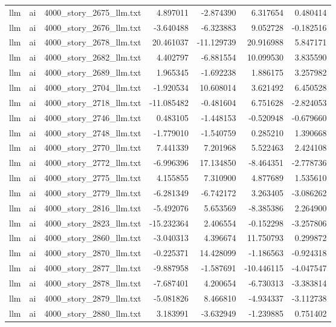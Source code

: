 \begin{longtable}{lllrrrr}
llm & ai & 4000\_story\_2675\_llm.txt & 4.897011 & -2.874390 & 6.317654 & 0.480414 \\
llm & ai & 4000\_story\_2676\_llm.txt & -3.640488 & -6.323883 & 9.052728 & -0.182516 \\
llm & ai & 4000\_story\_2678\_llm.txt & 20.461037 & -11.129739 & 20.916988 & 5.847171 \\
llm & ai & 4000\_story\_2682\_llm.txt & 4.402797 & -6.881554 & 10.099530 & 3.835590 \\
llm & ai & 4000\_story\_2689\_llm.txt & 1.965345 & -1.692238 & 1.886175 & 3.257982 \\
llm & ai & 4000\_story\_2704\_llm.txt & -1.920534 & 10.608014 & 3.621492 & 6.450528 \\
llm & ai & 4000\_story\_2718\_llm.txt & -11.085482 & -0.481604 & 6.751628 & -2.824053 \\
llm & ai & 4000\_story\_2746\_llm.txt & 0.483105 & -1.448153 & -0.520948 & -0.679660 \\
llm & ai & 4000\_story\_2748\_llm.txt & -1.779010 & -1.540759 & 0.285210 & 1.390668 \\
llm & ai & 4000\_story\_2770\_llm.txt & 7.441339 & 7.201968 & 5.522463 & 2.424108 \\
llm & ai & 4000\_story\_2772\_llm.txt & -6.996396 & 17.134850 & -8.464351 & -2.778736 \\
llm & ai & 4000\_story\_2775\_llm.txt & 4.155855 & 7.310900 & 4.877689 & 1.535610 \\
llm & ai & 4000\_story\_2779\_llm.txt & -6.281349 & -6.742172 & 3.263405 & -3.086262 \\
llm & ai & 4000\_story\_2816\_llm.txt & -5.492076 & 5.653569 & -8.385386 & 2.264900 \\
llm & ai & 4000\_story\_2823\_llm.txt & -15.232364 & 2.406554 & -0.152298 & -3.257806 \\
llm & ai & 4000\_story\_2860\_llm.txt & -3.040313 & 4.396674 & 11.750793 & 0.299872 \\
llm & ai & 4000\_story\_2870\_llm.txt & -0.225371 & 14.428099 & -1.186563 & -0.924318 \\
llm & ai & 4000\_story\_2877\_llm.txt & -9.887958 & -1.587691 & -10.446115 & -4.047547 \\
llm & ai & 4000\_story\_2878\_llm.txt & -7.687401 & 4.200654 & -6.730313 & -3.383814 \\
llm & ai & 4000\_story\_2879\_llm.txt & -5.081826 & 8.466810 & -4.934337 & -3.112738 \\
llm & ai & 4000\_story\_2880\_llm.txt & 3.183991 & -3.632949 & -1.239885 & 0.751402 \\

\end{longtable}
